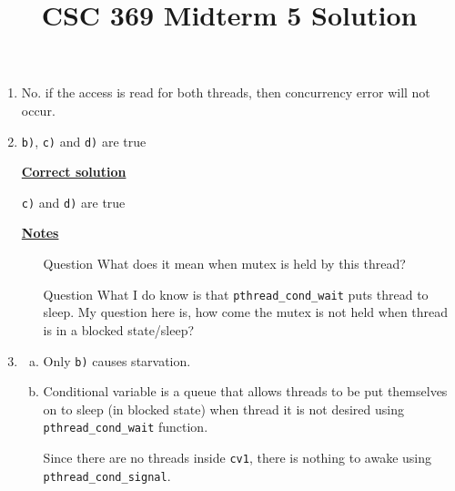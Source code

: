 \documentclass[12pt]{article}
\begin{document}
\title{CSC 369 Midterm 5 Solution}

\bigskip

\begin{enumerate}[1.]
    \item

    No. if the access is read for both threads, then concurrency error will not occur.

    \item

    \texttt{b)}, \texttt{c)} and \texttt{d)} are true

    \bigskip

    \begin{mdframed}
    \underline{\textbf{Correct solution}}

    \bigskip

    \texttt{c)} and \texttt{d)} are true
    \end{mdframed}

    \bigskip

    \underline{\textbf{Notes}}

    \begin{itemize}
        \item [\color{blue}Question\color{black}] What does it mean when mutex is held by this thread?
        \item [\color{blue}Question\color{black}] What I do know is that \texttt{pthread\_cond\_wait}
        puts thread to sleep. My question here is, how come the mutex is not held when thread is in a blocked state/sleep?
    \end{itemize}

    \item

    \begin{enumerate}[a)]
        \item

        Only \texttt{b)} causes starvation.

        \item

        Conditional variable is a queue that allows threads to be put themselves on to
        sleep (in blocked state) when thread it is not desired using \texttt{pthread\_cond\_wait}
        function.

        \bigskip

        Since there are no threads inside \texttt{cv1}, there is nothing to awake using
        \texttt{pthread\_cond\_signal}.

        \bigskip


\end{enumerate}
\end{enumerate}
\end{document}
